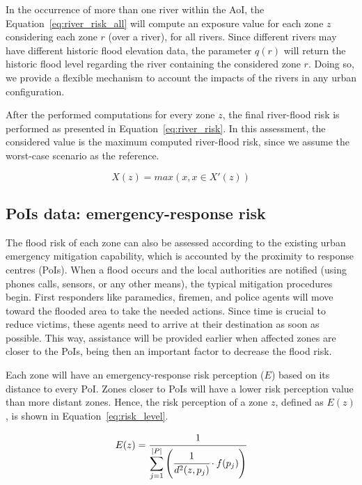 \begin{refsection}
In the occurrence of more than one river within the AoI, the Equation~\ref{eq:river_risk_all} will compute an exposure value for each zone $z$ considering each zone $r$ (over a river), for all rivers. Since different rivers may have different historic flood elevation data, the parameter $q(r)$ will return the historic flood level regarding the river containing the considered zone $r$. Doing so, we provide a flexible mechanism to account the impacts of the rivers in any urban configuration. 

After the performed computations for every zone $z$, the final river-flood risk is performed as presented in Equation~\ref{eq:river_risk}. In this assessment, the considered value is the maximum computed river-flood risk, since we assume the worst-case scenario as the reference.

\begin{equation}
    \label{eq:river_risk}
    X(z) = max({x, x \in X'(z)})
\end{equation}

\subsection{PoIs data: emergency-response risk}

The flood risk of each zone can also be assessed according to the existing urban emergency mitigation capability, which is accounted by the proximity to response centres (PoIs). When a flood occurs and the local authorities are notified (using phones calls, sensors, or any other means), the typical mitigation procedures begin. First responders like paramedics, firemen, and police agents will move toward the flooded area to take the needed actions. Since time is crucial to reduce victims, these agents need to arrive at their destination as soon as possible. This way, assistance will be provided earlier when affected zones are closer to the PoIs, being then an important factor to decrease the flood risk.

Each zone will have an emergency-response risk perception ($E$) based on its distance to every PoI. Zones closer to PoIs will have a lower risk perception value than more distant zones. Hence, the risk perception of a zone $z$, defined as $E(z)$, is shown in Equation~\ref{eq:risk_level}.

\begin{equation}
    \label{eq:risk_level}
    E(z) = \cfrac{1}{\displaystyle\sum_{j = 1}^{\lvert P \rvert}\left(\cfrac{1}{d^2(z, p_j)} \cdot f(p_j)\right)} 
\end{equation}


\end{refsection}
